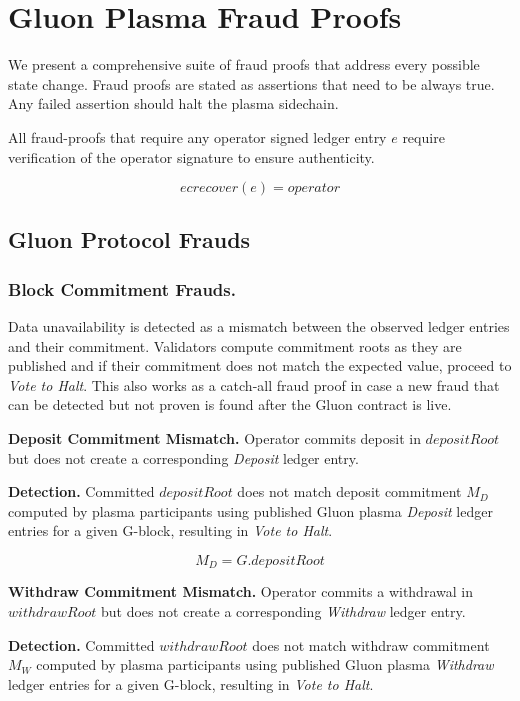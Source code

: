 \documentclass[12pt,a4paper]{article}
\begin{document}
\section{Gluon Plasma Fraud Proofs}

We present a comprehensive suite of fraud proofs that address every possible state change. Fraud proofs are stated as assertions that need to be always true. Any failed assertion should halt the plasma sidechain.

All fraud-proofs that require any operator signed ledger entry $e$ require verification of the operator signature to ensure authenticity.

\begin{equation}
    ecrecover(e) = operator
\end{equation}

\subsection{Gluon Protocol Frauds}

\subsubsection{Block Commitment Frauds.}\label{fp:bcf}
Data unavailability is detected as a mismatch between the observed ledger entries and their commitment. Validators compute commitment roots as they are published and if their commitment does not match the expected value, proceed to \emph{Vote to Halt}. This also works as a catch-all fraud proof in case a new fraud that can be detected but not proven is found after the Gluon contract is live.


\textbf{Deposit Commitment Mismatch.} Operator commits deposit in $depositRoot$ but does not create a corresponding \emph{Deposit} ledger entry.

\textbf{Detection.}
Committed $depositRoot$ does not match deposit commitment $M_D$ computed by plasma participants using published Gluon plasma \emph{Deposit} ledger entries for a given G-block, resulting in \emph{Vote to Halt}.

\begin{equation}
M_D = G.depositRoot
\end{equation}

\textbf{Withdraw Commitment Mismatch.}
Operator commits a withdrawal in $withdrawRoot$ but does not create a corresponding \emph{Withdraw} ledger entry.

\textbf{Detection.}
Committed $withdrawRoot$ does not match withdraw commitment $M_W$ computed by plasma participants using published Gluon plasma \emph{Withdraw} ledger entries for a given G-block, resulting in \emph{Vote to Halt}.
\end{document}
